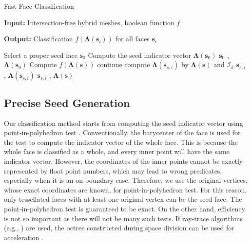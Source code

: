 \documentclass[10pt,journal,compsoc]{IEEEtran}
\begin{document}
\begin{algorithm}
\caption{Fast Face Classification}
\label{code:floodfill}
\textbf{Input: } Intersection-free hybrid meshes, boolean function $f$

\textbf{Output: } Classification $f(\bm{\Lambda}(\bm{s}_i))$ for all faces $\bm{s}_i$


\begin{algorithmic}[1]
\State Select a proper seed face $\bm{s}_0$
\State Compute the seed indicator vector $\boldsymbol{\Lambda}(\bm{s}_0)$
\State {} { $\bm{s}_0$ , $\boldsymbol{\Lambda}(\bm{s}_0)$}
\State
{}
    \State Compute $f(\boldsymbol{\Lambda}(\bm{s}))$
            \State continue
        \EndIf
            \State compute $\boldsymbol{\Lambda}(\bm{s}_{s, i})$ by $\boldsymbol{\Lambda}(\bm{s})$ and ${\bm{\mathcal{I}}}_k$
            \State {} { $\bm{s}_{s, i}$ , $\boldsymbol{\Lambda}(\bm{s}_{s, i})$}
        \Else
            \State {} { $\bm{s}_{s, i}$ , $\boldsymbol{\Lambda}(\bm{s})$}
        \EndIf
    \EndFor
\EndFunction
\end{algorithmic}
\end{algorithm}

\iffalse
\subsection{Precise Seed Generation}

Our classification method starts from computing the seed indicator vector using point-in-polyhedron test \cite{ogayar2005point}. Conventionally, the barycenter of the face is used for the test to compute the indicator vector of the whole face. This is because the whole face is classified as a whole, and every inner point will have the same indicator vector. However, the coordinates of the inner points cannot be exactly represented by float point numbers, which may lead to wrong predicates, especially when it is an on-boundary case. Therefore, we use the original vertices, whose exact coordinates are known, for point-in-polyhedron test. For this reason, only tessellated faces with at least one original vertex can be the seed face. The point-in-polyhedron test is guaranteed to be exact. On the other hand, efficiency is not so important as there will not be many such tests. If ray-trace algorithms (e.g., \cite{frisken2002simple}) are used, the octree constructed during space division can be used for acceleration \cite{havran1999summary}.
\end{document}

